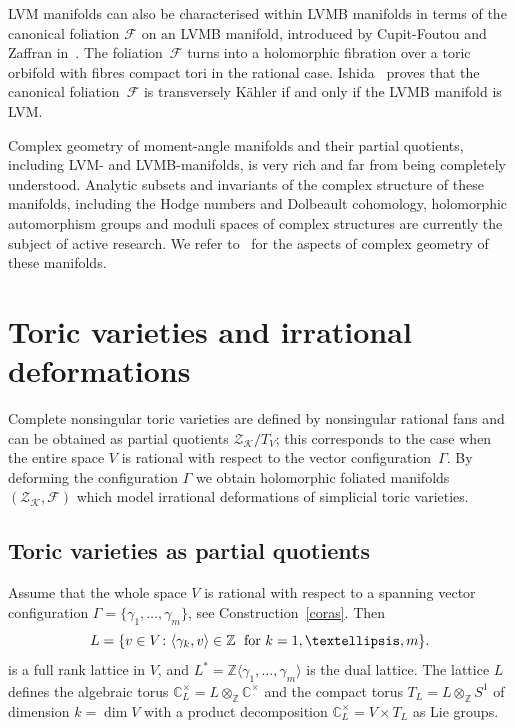 \documentclass[a4paper]{amsart}
\theoremstyle{definition}
\theoremstyle{remark}
\numberwithin{equation}{section}
\def\C{\mathbb C}
\def\Z{\mathbb Z}
\newcommand{\mb}[1]{{\textbf {\textit#1}}}
\newcommand{\zk}{\mathcal Z_{\mathcal K}}
\newcommand{\<}{\langle}
\renewcommand{\>}{\rangle}
\begin{document}
LVM manifolds can also be characterised within LVMB manifolds in terms of the canonical foliation $\mathcal F$ on an LVMB manifold, introduced by Cupit-Foutou and Zaffran in~\cite{cu-za07}. The foliation~$\mathcal F$ turns into a holomorphic fibration over a toric orbifold with fibres compact tori in the rational case. Ishida~\cite{ishi17} proves that the canonical foliation~$\mathcal F$ is transversely K\"ahler if and only if the LVMB manifold is LVM.

Complex geometry of moment-angle manifolds and their partial quotients, including LVM- and LVMB-manifolds, is very rich and far from being completely understood. Analytic subsets and invariants of the complex structure of these manifolds, including the Hodge numbers and Dolbeault cohomology, holomorphic automorphism groups and moduli spaces of complex structures are currently the subject of active research. We refer to~\cite{me-ve04,bo-me06,pa-us12,tamb12,batt13,cai15,p-u-v16,kr-pa21,i-k-p22} for the aspects of complex geometry of these manifolds.



\section{Toric varieties and irrational deformations}\label{sectoric}

Complete nonsingular toric varieties are defined by nonsingular rational fans and can be obtained as partial quotients $\zk/T_V$; this corresponds to the case when the entire space $V$ is rational with respect to the vector configuration~$\Gamma$. By deforming the configuration $\Gamma$ we obtain holomorphic foliated manifolds $(\zk,\mathcal F)$ which model irrational deformations of simplicial toric varieties.

\subsection{Toric varieties as partial quotients}
Assume that the whole space $V$ is rational with respect to a spanning vector configuration $\Gamma=\{\gamma_1,\ldots,\gamma_m\}$, see Construction~\ref{coras}. Then 
\begin{equation}\label{Llatice}
   L=
  \{\mb v\in V\colon\langle\gamma_k,\mb v\rangle\in\Z\;
  \text{ for }k=1,\ldots,m\}.
\end{equation}
is a full rank lattice in $V$, and $L^*=\Z\langle\gamma_1,\ldots,\gamma_m\rangle$ is the dual lattice. The lattice $L$ defines the algebraic torus 
$\C^\times_L=L\otimes_\Z\C^\times$ and the compact torus $T_L=L\otimes_\Z S^1$ of dimension $k=\dim V$ with a product decomposition $\C^\times_L=V\times T_L$ as Lie groups.
\end{document}
